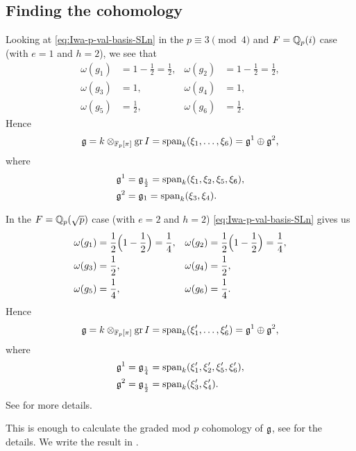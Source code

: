 \subsection{Finding the cohomology}%
\label{subsec:graded-coh-SL2-F}

Looking at \eqref{eq:Iwa-p-val-basis-SLn} in the $p\equiv 3\pmod{4}$ and $F = \mathbb{Q}_{p}(i)$ case (with $e=1$ and $h=2$), we see that
\begin{align*}
  \omega(g_{1}) &= 1-\frac{1}{2} = \frac{1}{2}, & \omega(g_{2}) &= 1-\frac{1}{2} = \frac{1}{2}, \\
  \omega(g_{3}) &= 1, & \omega(g_{4}) &= 1, \\
  \omega(g_{5}) &= \frac{1}{2}, & \omega(g_{6}) &= \frac{1}{2}.
\end{align*}
Hence
\begin{equation*}
  \mathfrak{g} = k \otimes_{\mathbb{F}_{p}[\pi]} \operatorname{gr} I = \operatorname{span}_{k}(\xi_{1},\dotsc,\xi_{6}) = \mathfrak{g}^{1} \oplus \mathfrak{g}^{2},
\end{equation*}
where
\begin{align*}
  \mathfrak{g}^{1} &= \mathfrak{g}_{\frac{1}{2}} = \operatorname{span}_{k}(\xi_{1},\xi_{2},\xi_{5},\xi_{6}), \\
  \mathfrak{g}^{2} &= \mathfrak{g}_{1} = \operatorname{span}_{k}(\xi_{3},\xi_{4}).
\end{align*}

In the $F = \mathbb{Q}_{p}(\sqrt{p})$ case (with $e=2$ and $h=2$) \eqref{eq:Iwa-p-val-basis-SLn} gives us
\begin{align*}
  \omega(g_{1}) &= \frac{1}{2}\Bigl( 1-\frac{1}{2} \Bigr) = \frac{1}{4}, & \omega(g_{2}) &= \frac{1}{2}\Bigl( 1-\frac{1}{2} \Bigr) = \frac{1}{4}, \\
  \omega(g_{3}) &= \frac{1}{2}, & \omega(g_{4}) &= \frac{1}{2}, \\
  \omega(g_{5}) &= \frac{1}{4}, & \omega(g_{6}) &= \frac{1}{4}.
\end{align*}
Hence
\begin{equation*}
  \mathfrak{g} = k \otimes_{\mathbb{F}_{p}[\pi]} \operatorname{gr} I = \operatorname{span}_{k}(\xi_{1}',\dotsc,\xi_{6}') = \mathfrak{g}^{1} \oplus \mathfrak{g}^{2},
\end{equation*}
where
\begin{align*}
  \mathfrak{g}^{1} &= \mathfrak{g}_{\frac{1}{4}} = \operatorname{span}_{k}(\xi_{1}',\xi_{2}',\xi_{5}',\xi_{6}'), \\
  \mathfrak{g}^{2} &= \mathfrak{g}_{\frac{1}{2}} = \operatorname{span}_{k}(\xi_{3}',\xi_{4}').
\end{align*}
See  for more details.

This is enough to calculate the graded mod $p$ cohomology of $\mathfrak{g}$, see \cite{code} for the details. We write the result in .

